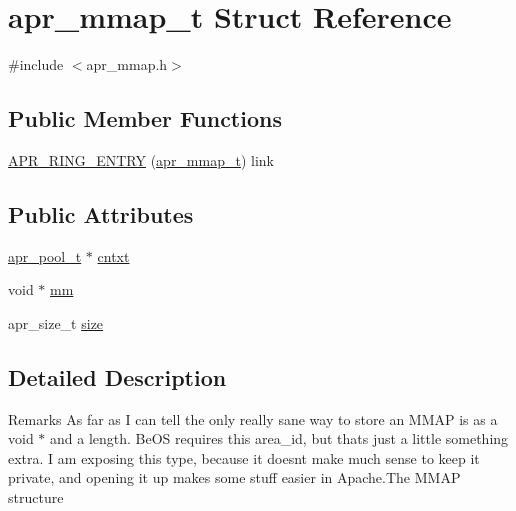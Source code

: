 \hypertarget{structapr__mmap__t}{}\section{apr\+\_\+mmap\+\_\+t Struct Reference}
\label{structapr__mmap__t}


{\ttfamily \#include $<$apr\+\_\+mmap.\+h$>$}

\subsection*{Public Member Functions}
\begin{DoxyCompactItemize}
\item 
\mbox{\hyperlink{structapr__mmap__t_aeca30aed7539548d31b7c0115020af62}{A\+P\+R\+\_\+\+R\+I\+N\+G\+\_\+\+E\+N\+T\+RY}} (\mbox{\hyperlink{structapr__mmap__t}{apr\+\_\+mmap\+\_\+t}}) link
\end{DoxyCompactItemize}
\subsection*{Public Attributes}
\begin{DoxyCompactItemize}
\item 
\mbox{\hyperlink{group__apr__pools_gaf137f28edcf9a086cd6bc36c20d7cdfb}{apr\+\_\+pool\+\_\+t}} $\ast$ \mbox{\hyperlink{structapr__mmap__t_a42d01080278bbc9bad26728f9a71c492}{cntxt}}
\item 
void $\ast$ \mbox{\hyperlink{structapr__mmap__t_abcc62d7e7c8187311e6619faf0d44f19}{mm}}
\item 
apr\+\_\+size\+\_\+t \mbox{\hyperlink{structapr__mmap__t_a274aea0906a4b674e1642ac9e81966c7}{size}}
\end{DoxyCompactItemize}


\subsection{Detailed Description}
\begin{DoxyRemark}{Remarks}
As far as I can tell the only really sane way to store an M\+M\+AP is as a void $\ast$ and a length. Be\+OS requires this area\+\_\+id, but that\textquotesingle{}s just a little something extra. I am exposing this type, because it doesn\textquotesingle{}t make much sense to keep it private, and opening it up makes some stuff easier in Apache.\+The M\+M\+AP structure 
\end{DoxyRemark}


